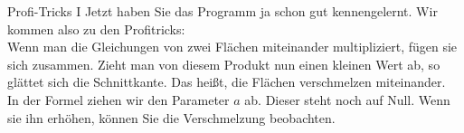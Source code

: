 \begin{surferPage}{Profi-Tricks I}   
Jetzt haben Sie das Programm ja schon gut kennengelernt. Wir kommen also zu den Profitricks:\\
\vspace{0.3cm}
Wenn man die Gleichungen von zwei Flächen miteinander multipliziert, fügen sie sich zusammen. Zieht man von diesem Produkt nun einen kleinen Wert ab, so glättet sich die Schnittkante. Das heißt, die Flächen verschmelzen miteinander. \\
\vspace{0.3cm}
In der Formel ziehen wir den Parameter $a$ ab. Dieser steht noch auf Null. Wenn sie ihn erhöhen, können Sie die Verschmelzung beobachten.
\end{surferPage}
